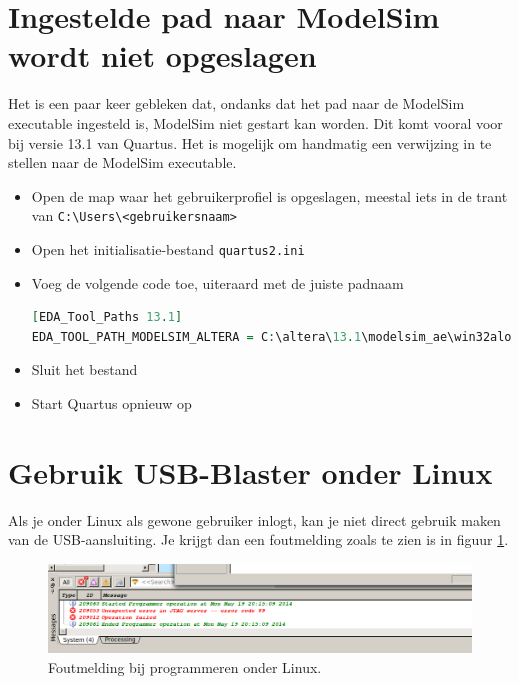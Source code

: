 \documentclass[a4paper,12pt,fleqn,twoside]{book}
\def\tutpicscale{0.455}
\begin{document}
\fi


\section{Ingestelde pad naar ModelSim wordt niet opgeslagen}
Het is een paar keer gebleken dat, ondanks dat het pad naar de ModelSim
executable ingesteld is, ModelSim niet gestart kan worden. Dit komt vooral
voor bij versie 13.1 van Quartus. Het is mogelijk om handmatig een
verwijzing in te stellen naar de ModelSim executable.

\begin{itemize}\itemsep-1pt
\item Open de map waar het gebruikerprofiel is opgeslagen, meestal iets in
      de trant van \lstinline|C:\Users\<gebruikersnaam>|
\item Open het initialisatie-bestand \lstinline|quartus2.ini|
\item Voeg de volgende code toe, uiteraard met de juiste padnaam
\begin{lstlisting}[language=VHDL,numbers=none,belowskip=-3.5ex]
[EDA_Tool_Paths 13.1]
EDA_TOOL_PATH_MODELSIM_ALTERA = C:\altera\13.1\modelsim_ae\win32aloem
\end{lstlisting}
\item Sluit het bestand
\item Start Quartus opnieuw op

\end{itemize}

\section{Gebruik USB-Blaster onder Linux}
Als je onder Linux als gewone gebruiker inlogt, kan je niet direct gebruik
maken van de USB-aansluiting. Je krijgt dan een foutmelding zoals te zien is
in figuur \ref{fig:230jtagerror89}.


\begin{figure}[H]
\centering
\includegraphics[scale=\tutpicscale]{231Aquartus_errorCode_89}
\caption{Foutmelding bij programmeren onder Linux.}
\label{fig:230jtagerror89}
\end{figure}
\end{document}
